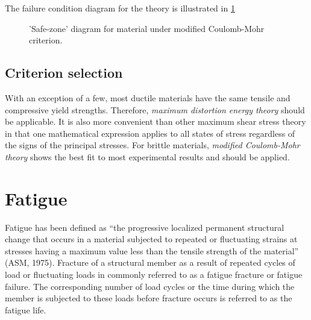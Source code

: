 \documentclass[
10pt,
a4paper,
openany,
svgnames,
]{book} %
\begin{document}
The failure condition diagram for the theory is illustrated in \cref{fig: MCM safe zone}

\begin{figure}[h]
  \centering
  \caption{'Safe-zone' diagram for material under modified Coulomb-Mohr criterion.}
  \label{fig: MCM safe zone}
\end{figure}

\subsection{Criterion selection}

With an exception of a few, most ductile materials have the same tensile and compressive yield strengths. Therefore, \emph{maximum distortion energy theory} should be applicable. It is also more convenient than other maximum shear stress theory in that one mathematical expression applies to all states of stress regardless of the signs of the principal stresses.
For brittle materials, \emph{modified Coulomb-Mohr theory} shows the best fit to most experimental results and should be applied.

\section{Fatigue} \label{section: fatigue failure}

Fatigue has been defined as “the progressive localized permanent structural change that occurs in a material subjected to repeated or fluctuating strains at stresses having a maximum value less than the tensile strength of the material” (ASM, 1975). Fracture of a structural member as a result of repeated cycles of load or fluctuating loads in commonly referred to as a fatigue fracture or fatigue failure. The corresponding number of load cycles or the time during which the member is subjected to these loads before fracture occurs is referred to as the fatigue life.
\end{document}
